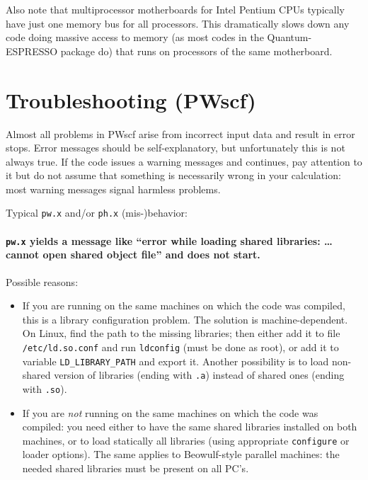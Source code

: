 \documentclass[12pt,a4paper]{article}
\begin{document}
Also note that multiprocessor motherboards for Intel Pentium CPUs 
typically have just one memory bus for all processors. This dramatically 
slows down any code doing massive access to memory (as most codes in the 
Quantum-ESPRESSO package do) that runs on processors of the same motherboard.
\clearpage

\section{Troubleshooting (PWscf)}

Almost all problems in PWscf arise from incorrect input data and
result in error stops. Error messages should be self-explanatory, 
but unfortunately this is not always true. If the code issues a
warning messages and continues, pay attention to it but do not
assume that something is necessarily wrong in your calculation:
most warning messages signal harmless problems.

Typical \texttt{pw.x} and/or \texttt{ph.x} (mis-)behavior:

\paragraph{\texttt{pw.x} yields a message like ``error while loading
           shared libraries: \dots{} cannot open shared object file''
           and does not start.}

Possible reasons: 

\begin{itemize}
  \item
    If you are running on the same machines on which the code was
    compiled, this is a library configuration problem.
    The solution is machine-dependent.
    On Linux, find the path to the missing libraries; then either add
    it to file \texttt{/etc/ld.so.conf} and run \texttt{ldconfig}
    (must be done as root), or add it to variable
    \texttt{LD\_LIBRARY\_PATH} and export it.
    Another possibility is to load non-shared version of libraries
    (ending with \texttt{.a}) instead of shared ones (ending with
    \texttt{.so}).
  \item
    If you are \emph{not} running on the same machines on which the
    code was compiled: you need either to have the same shared
    libraries installed on both machines, or to load statically all
    libraries (using appropriate \texttt{configure} or loader options). 
    The same applies to Beowulf-style parallel machines: the needed 
    shared libraries must be present on all PC's.
\end{itemize}
\end{document}
